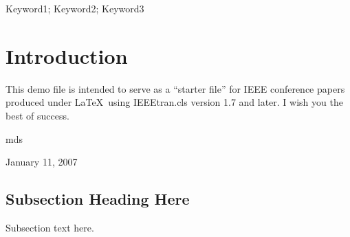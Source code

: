 \documentclass[conference, letterpaper]{IEEEtran}
\begin{document}




\maketitle


\begin{abstract}
The abstract goes here.
\end{abstract}



\begin{IEEEkeywords}
Keyword1; Keyword2; Keyword3
\end{IEEEkeywords}


%
\IEEEpeerreviewmaketitle



\section{Introduction}
This demo file is intended to serve as a ``starter file''
for IEEE conference papers produced under \LaTeX\ using
IEEEtran.cls version 1.7 and later.
I wish you the best of success.

\hfill mds
 
\hfill January 11, 2007

\subsection{Subsection Heading Here}
Subsection text here.
\end{document}

